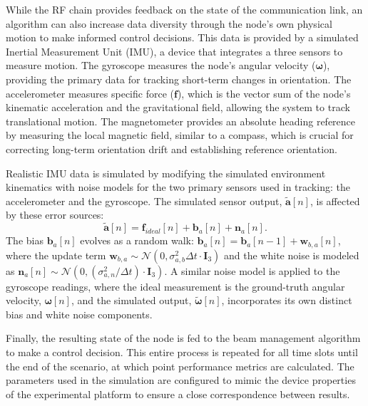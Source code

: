 \documentclass[fleqn,10pt]{wlscirep}
\begin{document}
While the RF chain provides feedback on the state of the communication link, an algorithm can also increase data diversity through the node's own physical motion to make informed control decisions. This data is provided by a simulated Inertial Measurement Unit (IMU), a device that integrates a three sensors to measure motion. The gyroscope measures the node's angular velocity ($\boldsymbol{\omega}$), providing the primary data for tracking short-term changes in orientation. The accelerometer measures specific force ($\mathbf{f}$), which is the vector sum of the node's kinematic acceleration and the gravitational field, allowing the system to track translational motion. The magnetometer provides an absolute heading reference by measuring the local magnetic field, similar to a compass, which is crucial for correcting long-term orientation drift and establishing reference orientation.

Realistic IMU data is simulated by modifying the simulated environment kinematics with noise models for the two primary sensors used in tracking: the accelerometer and the gyroscope. The simulated sensor output, $\tilde{\mathbf{a}}[n]$, is affected by these error sources:
\begin{equation}
    \tilde{\mathbf{a}}[n] = \mathbf{f}_{ideal}[n] + \mathbf{b}_{a}[n] + \mathbf{n}_{a}[n].
\end{equation}
The bias $\mathbf{b}_{a}[n]$ evolves as a random walk: $\mathbf{b}_{a}[n] = \mathbf{b}_{a}[n-1] + \mathbf{w}_{b,a}[n]$, where the update term $\mathbf{w}_{b,a} \sim \mathcal{N}(0, \sigma_{a,b}^2 \Delta t \cdot \mathbf{I}_3)$ and the white noise is modeled as $\mathbf{n}_{a}[n] \sim \mathcal{N}(0, (\sigma_{a,n}^2 / \Delta t) \cdot \mathbf{I}_3)$. A similar noise model is applied to the gyroscope readings, where the ideal measurement is the ground-truth angular velocity, $\boldsymbol{\omega}[n]$, and the simulated output, $\tilde{\boldsymbol{\omega}}[n]$, incorporates its own distinct bias and white noise components.

Finally, the resulting state of the node is fed to the beam management algorithm to make a control decision. This entire process is repeated for all time slots until the end of the scenario, at which point performance metrics are calculated. The parameters used in the simulation are configured to mimic the device properties of the experimental platform to ensure a close correspondence between results.
\end{document}
